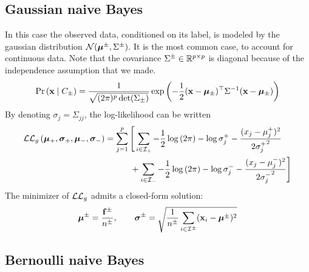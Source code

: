 \subsection{Gaussian naive Bayes}\label{subsec:gnb}

In this case the observed data, conditioned on its label, is modeled by the gaussian distribution
$\mathcal{N}( \bm{\mu}^\pm, \Sigma^\pm )$.
It is the most common case, to account for continuous data.
Note that the covariance $\Sigma^\pm \in \mathbb{R}^{p \times p}$ is diagonal because of the independence assumption that we made.
\[
        \Pr\left( \mathbf{x} \mid C_\pm \right) =
        \frac{1}{\sqrt{(2\pi)^p\det(\Sigma_\pm)}}
        \exp\left( -\frac{1}{2}(\mathbf{x} - \bm{\mu}_\pm)^\top\Sigma^{-1}(\mathbf{x} - \bm{\mu}_\pm) \right)
\]
By denoting $\sigma_j = \Sigma_{j j}$, the log-likelihood can be written
\begin{equation*}
        \begin{split}
                \mathcal{L}\mathcal{L}_g\left( \bm{\mu}_+, \bm{\sigma}_+, \bm{\mu}_-, \bm{\sigma}_-\right ) &=
                        \sum_{j = 1}^p \Bigg[
                                \sum_{i \in \mathcal{I}_+}
                                        -\frac{1}{2} \log \left( 2\pi \right)
                                        -\log \sigma_j^+
                                        -\frac{(x_j - \mu^+_j)^2}{2{\sigma^+_j}^2}\\
                                &\qquad\quad+ \sum_{i \in \mathcal{I}_-}
                                        -\frac{1}{2} \log \left( 2\pi \right)
                                        -\log \sigma_j^-
                                        -\frac{(x_j - \mu^-_j)^2}{2{\sigma^-_j}^2}
                        \Bigg]
        \end{split}
\end{equation*}
The minimizer of $\mathcal{L}\mathcal{L}_g$ admits a closed-form solution:
\begin{align*}
        \bm{\mu}^\pm = \frac{\mathbf{f}^\pm}{n^\pm}
        ,\qquad
        \bm{\sigma}^\pm = \sqrt{\frac{1}{n^\pm} \sum_{i \in \mathcal{I}^\pm} (\mathbf{x}_i - \bm{\mu}^\pm)^2}
\end{align*}

\subsection{Bernoulli naive Bayes}\label{subsec:bnb}

